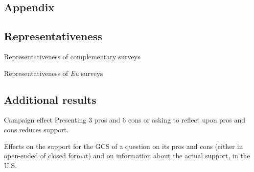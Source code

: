 \documentclass[aspectratio=169,xcolor=dvipsnames, 11pt,mathserif]{beamer}
\begin{document}
\begin{framefont}{\small}
\appendix
\section{Appendix}

\subsection{Representativeness}\label{representativeness}

\begin{frame}{Representativeness of complementary surveys \hyperlink{questionnaires}{}}
    \vspace{-.6cm}
\begin{table}[h!]
    \makebox[\textwidth][c]{
        \resizebox*{!}{1.18\textheight}{
        
        }
    }
\end{table}
\end{frame}

\begin{frame}{Representativeness of \textit{Eu} surveys \hyperlink{questionnaires}{}}
    \vspace{-.6cm}
    \begin{table}[h]
        \makebox[\textwidth][c]{
            \resizebox*{!}{.97\textheight}{
            
            }
        }
    \end{table}
\end{frame}


\subsection{Additional results}

\begin{frame}{Campaign effect\label{campaign}}
	Presenting 3 pros and 6 cons or asking to reflect upon pros and cons reduces support.  \hyperlink{conjoint_d}{}
    \begin{table}[h]
      \caption{Effects on the support for the GCS of a question on its pros and cons (either in open-ended of closed format) and on information about the actual support, in the U.S.} \label{tab:branch_gcs}\vspace{-.4cm}
      \makebox[\textwidth][c]{
          
      }
    \end{table}
\end{frame}


\end{framefont}
\end{document}
